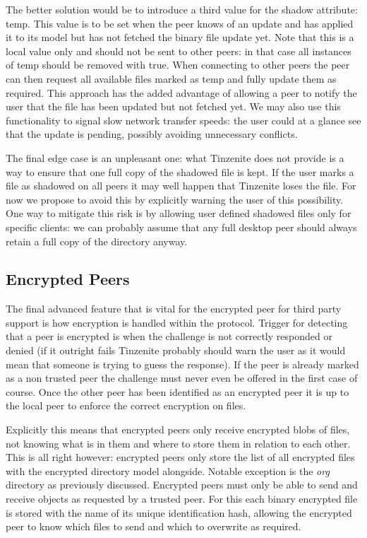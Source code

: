 The better solution would be to introduce a third value for the shadow attribute: temp.
This value is to be set when the peer knows of an update and has applied it to its model but has not fetched the binary file update yet.
Note that this is a local value only and should not be sent to other peers: in that case all instances of temp should be removed with true.
When connecting to other peers the peer can then request all available files marked as temp and fully update them as required.
This approach has the added advantage of allowing a peer to notify the user that the file has been updated but not fetched yet.
We may also use this functionality to signal slow network transfer speeds: the user could at a glance see that the update is pending, possibly avoiding unnecessary conflicts.

The final edge case is an unpleasant one: what Tinzenite does not provide is a way to ensure that one full copy of the shadowed file is kept.
If the user marks a file as shadowed on all peers it may well happen that Tinzenite loses the file.
For now we propose to avoid this by explicitly warning the user of this possibility.
One way to mitigate this risk is by allowing user defined shadowed files only for specific clients: we can probably assume that any full desktop peer should always retain a full copy of the directory anyway.


\subsection{Encrypted Peers}
\label{sub:Encrypted Peers}

The final advanced feature that is vital for the encrypted peer for third party support is how encryption is handled within the protocol.
Trigger for detecting that a peer is encrypted is when the challenge is not correctly responded or denied (if it outright fails Tinzenite probably should warn the user as it would mean that someone is trying to guess the response).
If the peer is already marked as a non trusted peer the challenge must never even be offered in the first case of course.
Once the other peer has been identified as an encrypted peer it is up to the local peer to enforce the correct encryption on files.

Explicitly this means that encrypted peers only receive encrypted blobs of files, not knowing what is in them and where to store them in relation to each other.
This is all right however: encrypted peers only store the list of all encrypted files with the encrypted directory model alongside.
Notable exception is the \textit{org} directory as previously discussed.
Encrypted peers must only be able to send and receive objects as requested by a trusted peer.
For this each binary encrypted file is stored with the name of its unique identification hash, allowing the encrypted peer to know which files to send and which to overwrite as required.

